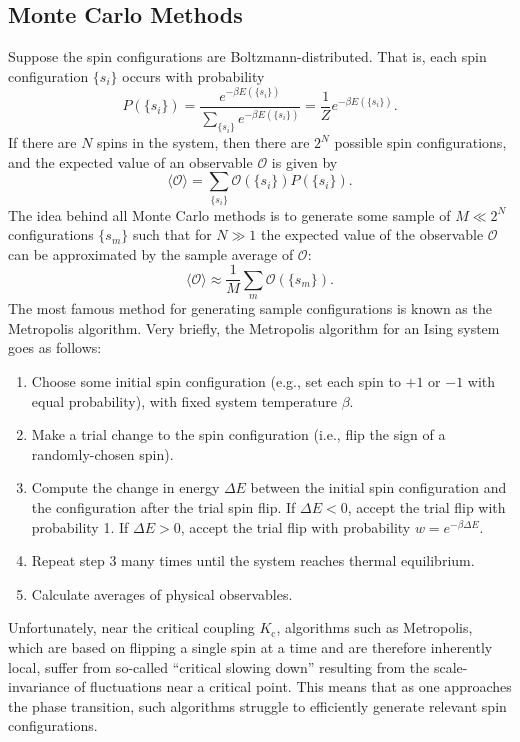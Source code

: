 \documentclass[11pt, oneside]{article}
\newcommand{\Kc}{K_\text{c}}
\begin{document}
\subsection{Monte Carlo Methods}
Suppose the spin configurations are Boltzmann-distributed. That is, each spin configuration $\{s_i\}$ occurs with probability
$$P(\{s_i\})=\frac{e^{-\beta E(\{s_i\})}}{\sum_{\{s_i\}}e^{-\beta E(\{s_i\})}}=\frac1Ze^{-\beta E(\{s_i\})}.$$
If there are $N$ spins in the system, then there are $2^N$ possible spin configurations, and the expected value of an observable $\mathcal{O}$ is given by
$$\langle\mathcal{O}\rangle=\sum_{\{s_i\}}\mathcal{O}(\{s_i\})P(\{s_i\}).$$
The idea behind all Monte Carlo methods is to generate some sample of $M\ll2^N$ configurations $\{s_m\}$ such that for $N\gg1$ the expected value of the observable $\mathcal{O}$ can be approximated by the sample average of $\mathcal{O}$:
$$\langle\mathcal{O}\rangle\approx\frac1M\sum_m\mathcal{O}(\{s_m\}).$$
The most famous method for generating sample configurations is known as the Metropolis algorithm. Very briefly, the Metropolis algorithm for an Ising system goes as follows:
\begin{enumerate}
\item{Choose some initial spin configuration (e.g., set each spin to $+1$ or $-1$ with equal probability), with fixed system temperature $\beta$.}
\item{Make a trial change to the spin configuration (i.e., flip the sign of a randomly-chosen spin).}
\item{Compute the change in energy $\Delta E$ between the initial spin configuration and the configuration after the trial spin flip. If $\Delta E<0$, accept the trial flip with probability 1. If $\Delta E>0$, accept the trial flip with probability $w=e^{-\beta\Delta E}$.}
\item{Repeat step 3 many times until the system reaches thermal equilibrium.}
\item{Calculate averages of physical observables.}
\end{enumerate}
Unfortunately, near the critical coupling $\Kc$, algorithms such as Metropolis, which are based on flipping a single spin at a time and are therefore inherently local, suffer from so-called ``critical slowing down'' resulting from the scale-invariance of fluctuations near a critical point. This means that as one approaches the phase transition, such algorithms struggle to efficiently generate relevant spin configurations.
\end{document}

